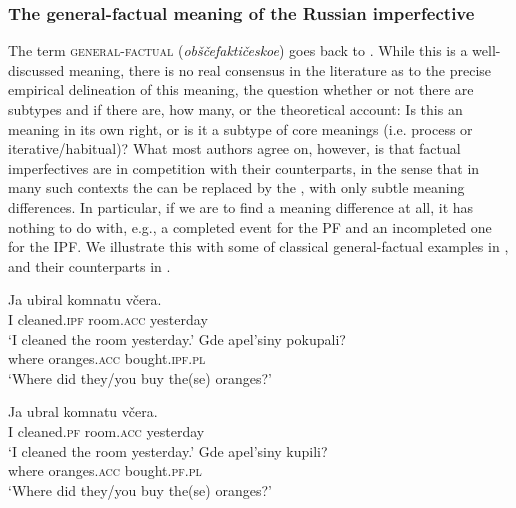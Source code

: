 \documentclass[output=paper,modfonts,newtxmath,hidelinks
\ChapterDOI{10.5281/zenodo.2545513}
]{langscibook}
\begin{document}
\subsubsection{The general-factual meaning of the Russian imperfective}
\label{OF}

The term \textsc{general-factual} (\textit{obščefaktičeskoe}) goes back to \citet{maslov59} \citep[for recent discussion see][]{mehlig16}. While this is a well-discussed  meaning, there is no real consensus in the literature \citep[see][chapter 4 for an overview and references]{gronndiss} as to the precise empirical delineation of this meaning, the question whether or not there are subtypes and if there are, how many, or the theoretical account: Is this an  meaning in its own right, or is it a subtype of core  meanings (i.e. process or iterative/habitual)? What most authors agree on, however, is that factual imperfectives are in  competition with their  counterparts, in the sense that in many such contexts the  can be replaced by the , with only subtle meaning differences. In particular, if we are to find a meaning difference at all, it has nothing to do with, e.g., a completed event for the PF and an incompleted one for the IPF. We illustrate this with some of  classical general-factual examples in , and their  counterparts in . 

\ea\label{oranges}
\ea\gll Ja ubiral komnatu včera.\\
       I cleaned.\textsc{ipf} room.\textsc{acc} yesterday\\
\glt       `I cleaned the room yesterday.'
\ex\gll Gde apel'siny pokupali?\\
               where oranges.\textsc{acc} bought.\textsc{ipf}.\textsc{pl} \\
\glt               `Where did they/you buy the(se) oranges?'
\z\z

\ea\label{orangesPF}
\ea\gll Ja ubral komnatu včera.\\
       I cleaned.\textsc{pf} room.\textsc{acc} yesterday\\
\glt       `I cleaned the room yesterday.'
\ex\gll Gde apel'siny kupili?\\
     where oranges.\textsc{acc} bought.\textsc{pf}.\textsc{pl}\\
\glt               `Where did they/you buy the(se) oranges?'
\z\z
\end{document}
